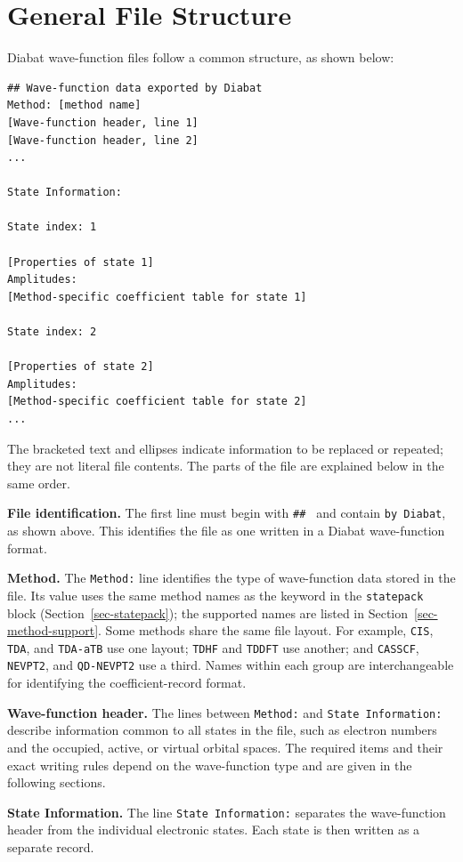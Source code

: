 \section{General File Structure}\label{sec-diabat-wfn-general}
Diabat wave-function files follow a common structure, as shown below:
\begin{lstlisting}[style=technicalfile]
## Wave-function data exported by Diabat
Method: [method name]
[Wave-function header, line 1]
[Wave-function header, line 2]
...

State Information:

State index: 1

[Properties of state 1]
Amplitudes:
[Method-specific coefficient table for state 1]

State index: 2

[Properties of state 2]
Amplitudes:
[Method-specific coefficient table for state 2]
...
\end{lstlisting}
The bracketed text and ellipses indicate information to be replaced or repeated; they are not literal file contents. The parts of the file are explained below in the same order.

\textbf{File identification.} The first line must begin with \texttt{\#\# } and contain \texttt{by Diabat}, as shown above. This identifies the file as one written in a Diabat wave-function format.

\textbf{Method.} The \texttt{Method:} line identifies the type of wave-function data stored in the file. Its value uses the same method names as the  keyword in the \texttt{statepack} block (Section~\ref{sec-statepack}); the supported names are listed in Section~\ref{sec-method-support}. Some methods share the same file layout. For example, \texttt{CIS}, \texttt{TDA}, and \texttt{TDA-aTB} use one layout; \texttt{TDHF} and \texttt{TDDFT} use another; and \texttt{CASSCF}, \texttt{NEVPT2}, and \texttt{QD-NEVPT2} use a third. Names within each group are interchangeable for identifying the coefficient-record format.

\textbf{Wave-function header.} The lines between \texttt{Method:} and \texttt{State Information:} describe information common to all states in the file, such as electron numbers and the occupied, active, or virtual orbital spaces. The required items and their exact writing rules depend on the wave-function type and are given in the following sections.

\textbf{State Information.} The line \texttt{State Information:} separates the wave-function header from the individual electronic states. Each state is then written as a separate record.

